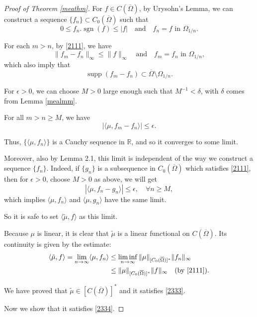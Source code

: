 \documentclass[a4paper, 11pt]{report}
\theoremstyle{definition}\newtheorem*{rmk}{Remark}
\DeclareMathOperator{\sgn}{sgn}
\DeclareMathOperator{\supp}{supp}
\begin{document}
\begin{proof}[Proof of Theorem \ref{meathm}]
\mbox{}

For $f \in C(\overline{\Omega})$, by Urysohn's Lemma, we can construct a sequence $\{ f_n \} \subset C_0(\overline{\Omega})$ such that
\begin{equation}\label{2111}
0 \le f_n.\sgn (f) \le |f|\quad \text{and} \quad f_n = f \text{ in } \Omega_{1/n}.
\end{equation}

For each $m > n$, by \eqref{2111}, we have
\[
\| f_m - f_n \|_{\infty} \le \| f\|_{\infty}\quad \text{and}\quad f_m = f_n \text{ in } \Omega_{1/n},
\]
which also imply that
\[
\supp (f_m - f_n) \subset \overline{\Omega}\setminus \Omega_{1/n}.
\]

For $\epsilon > 0$, we can choose $M > 0$ large enough such that $M^{-1}<\delta$, with $\delta$ comes from Lemma \ref{mealmm}. 

For all $m > n \ge M$, we have
\[
|\langle \mu ,f_m - f_n \rangle |\le \epsilon.
\]


Thus, $\{\langle \mu, f_n\rangle\}$ is a Cauchy sequence in $\mathbb{R}$, and so it converges to some limit.

Moreover, also by Lemma 2.1, this limit is independent of the way we construct a sequence $\{ f_n\}$. Indeed, if $\{ g_n\}$ is a subsequence in $C_0(\overline{\Omega})$ which satisfies \eqref{2111}, then for $\epsilon > 0$, choose $M > 0$ as above, we will get
\[
|\langle \mu ,f_n - g_n \rangle |\le \epsilon, \quad \forall n \ge M,
\]
which implies $\langle \mu ,f_n \rangle $ and $\langle \mu ,g_n \rangle $ have the same limit. 

So it is safe to set $\langle \tilde{\mu}, f\rangle$ as this limit.

Because $\mu$ is linear, it is clear that $\tilde{\mu}$ is a linear functional on $C(\overline{\Omega})$. Its continuity is given by the estimate:
\begin{align*}
\langle \tilde{\mu} , f \rangle = \lim_{n \to \infty} \langle \mu, f_n \rangle &\le \liminf_{n\to\infty}\| \mu \|_{[C_0(\overline{\Omega})]^*} \| f_n \|_{\infty} \\
&\le \| \mu \|_{[C_0(\overline{\Omega})]^*} \| f \|_{\infty} \quad \text{(by \eqref{2111})}.
\end{align*}

We have proved that $\tilde{\mu} \in [C(\overline{\Omega})]^*$ and it satisfies \eqref{2333}.

Now we show that it satisfies \eqref{2334}.


\end{proof}
\end{document}
